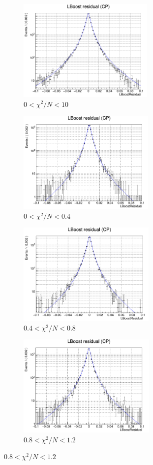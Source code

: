 \begin{figure}[htbp]
	\begin{subfigure}{0.5\linewidth}
		\caption{$0<\chi^2/N<10$}
		\includegraphics[height=5cm]{figures/residual0_10}
		
	\end{subfigure}
	\begin{subfigure}{0.5\linewidth}
		\caption{$0<\chi^2/N<0.4$}
		\includegraphics[height=5cm]{figures/residual0_0.4}
	\end{subfigure}
	
	
	\begin{subfigure}{0.5\linewidth}
		\caption{$0.4<\chi^2/N<0.8$}
		\includegraphics[height=5cm]{figures/residual0.4_0.8}
	\end{subfigure}
	\begin{subfigure}{0.5\linewidth}
		\caption{$0.8<\chi^2/N<1.2$}
		\includegraphics[height=5cm]{figures/residual0.8_1.2}
	\end{subfigure}
	

\end{figure}
